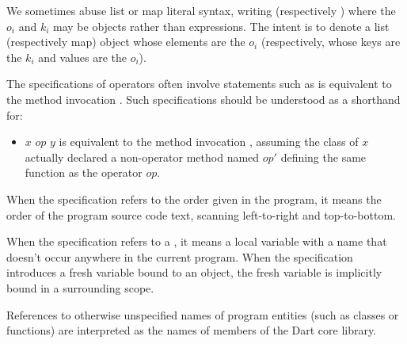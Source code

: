 \documentclass[makeidx]{article}
\begin{document}

\LMHash{}%
We sometimes abuse list or map literal syntax, writing \code{[\List{o}{1}{n}]}
(respectively )
where the $o_i$ and $k_i$ may be objects rather than expressions.
The intent is to denote a list (respectively map) object
whose elements are the $o_i$
(respectively, whose keys are the $k_i$ and values are the $o_i$).

\LMHash{}%
%
The specifications of operators often involve statements such as
 is equivalent to the method invocation
.
Such specifications should be understood as a shorthand for:
\begin{itemize}
\item
  $x$ $op$ $y$ is equivalent to the method invocation
  ,
  assuming the class of $x$ actually declared a non-operator method named $op'$
  defining the same function as the operator $op$.
\end{itemize}


\LMHash{}%
When the specification refers to the order given in the program,
it means the order of the program source code text,
scanning left-to-right and top-to-bottom.

\LMHash{}%
When the specification refers to a
,
it means a local variable with a name that doesn't occur anywhere
in the current program.
When the specification introduces a fresh variable bound to an object,
the fresh variable is implicitly bound in a surrounding scope.

\LMHash{}%
References to otherwise unspecified names of program entities
(such as classes or functions)
are interpreted as the names of members of the Dart core library.

\end{document}
